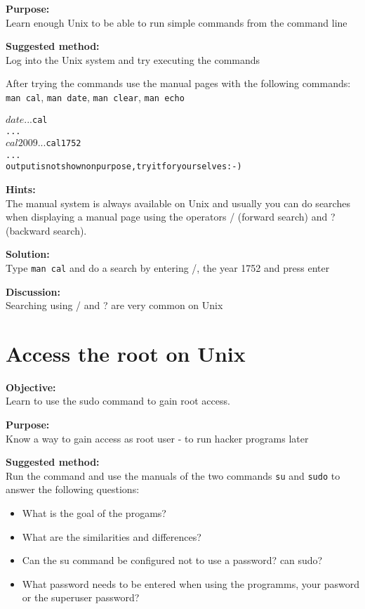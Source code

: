 \documentclass[a4paper,11pt,notitlepage]{report}
\begin{document}
{\bf Purpose:}\\
Learn enough Unix to be able to run simple commands from the command line

{\bf Suggested method:}\\
Log into the Unix system and try executing the commands

After trying the commands use the manual pages with the following commands:\\
\verb+man cal+, \verb+man date+, \verb+man clear+,
\verb+man echo+

\begin{alltt}
$ date
...
$ cal
...
$ cal 2009
...
$ cal 1752
...
output is not shown on purpose, try it for yourselves :-)
\end{alltt}

{\bf Hints:}\\
The manual system is always available on Unix and usually you can do searches when
displaying a manual page using the operators / (forward search) and ? (backward search).

{\bf Solution:}\\
Type \verb+man cal+ and do a search by entering /, the year 1752 and press enter

{\bf Discussion:}\\
Searching using / and ? are very common on Unix


\chapter{Access the root on Unix}
\label{ex:sudo}

{\bf Objective:}\\
Learn to use the sudo command to gain root access.

{\bf Purpose:}\\
Know a way to gain access as root user - to run hacker programs later

{\bf Suggested method:}\\
Run the command and use the manuals of the two commands \verb+su+ and \verb+sudo+
to answer the following questions:
\begin{itemize}
\item What is the goal of the progams?
\item What are the similarities and differences?
\item Can the su command be configured not to use a password? can sudo?
\item What password needs to be entered when using the programms, your pasword or the superuser password?
\end{itemize}
\end{document}
